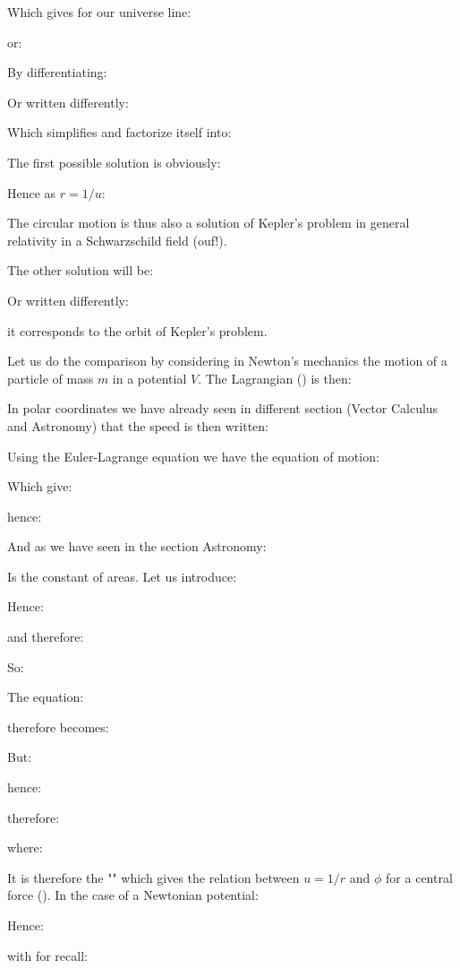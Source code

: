 	Which gives for our universe line:
	
	or:
	
	By differentiating:
	
	Or written differently:
	
	Which simplifies and factorize itself into:
	
	The first possible solution is obviously:
	
	Hence as $r=1/u$:
	
	The circular motion is thus also a solution of Kepler's problem in general relativity in a Schwarzschild field (ouf!).

	The other solution will be:
	
	Or written differently:
	
	it corresponds to the orbit of Kepler's problem.

	Let us do the comparison by considering in Newton's mechanics the motion of a particle of mass $m$ in a potential $V$. The Lagrangian () is then:
	
	In polar coordinates we have already seen in different section (Vector Calculus and Astronomy) that the speed is then written:
	
	Using the Euler-Lagrange equation we have the equation of motion:
	
	Which give:
	
	hence:
	
	And as we have seen in the section Astronomy:
	
	Is the constant of areas. Let us introduce:
	
	Hence:
	
	and therefore:
	
	So:
	
	The equation:
	
	therefore becomes:
	
	But:
	
	hence:
	
	therefore:
	
	where:
	
	It is therefore the "" which gives the relation between $u = 1 / r$ and $\phi$ for a central force (). In the case of a Newtonian potential:
	
	Hence:
	
	with for recall:
	
